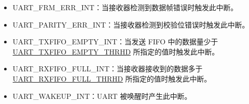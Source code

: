 \documentclass[main\_\_CN.tex]{subfiles}
\begin{document}
\begin{itemize}
\item \label{int:UARTFRMERRINT}UART\_FRM\_ERR\_INT：当接收器检测到数据帧错误时触发此中断。
\item \label{int:UARTPARITYERRINT}UART\_PARITY\_ERR\_INT：当接收器检测到校验位错误时触发此中断。
\item \label{int:UARTTXFIFOEMPTYINT}UART\_TXFIFO\_EMPTY\_INT：当发送 FIFO 中的数据量少于 \hyperref[fielddesc:UARTTXFIFOEMPTYTHRHD]{UART\_TXFIFO\_EMPTY\_THRHD} 所指定的值时触发此中断。
\item \label{int:UARTRXFIFOFULLINT}UART\_RXFIFO\_FULL\_INT：当接收器接收到的数据多于 \hyperref[fielddesc:UARTRXFIFOFULLTHRHD]{UART\_RXFIFO\_FULL\_THRHD} 所指定的值时触发此中断。
\item \label{int:UARTWAKEUPINT}UART\_WAKEUP\_INT：UART 被唤醒时产生此中断。
\end{itemize}
\end{document}
